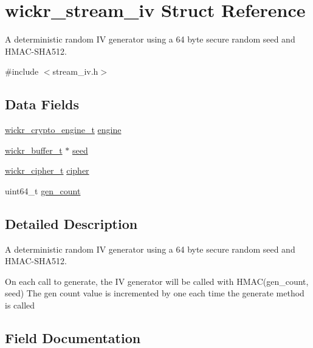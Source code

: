 \hypertarget{structwickr__stream__iv}{}\section{wickr\+\_\+stream\+\_\+iv Struct Reference}
\label{structwickr__stream__iv}


A deterministic random IV generator using a 64 byte secure random seed and H\+M\+A\+C-\/\+S\+H\+A512.  




{\ttfamily \#include $<$stream\+\_\+iv.\+h$>$}

\subsection*{Data Fields}
\begin{DoxyCompactItemize}
\item 
\mbox{\hyperlink{structwickr__crypto__engine}{wickr\+\_\+crypto\+\_\+engine\+\_\+t}} \mbox{\hyperlink{structwickr__stream__iv_a8c597718ade583db19204df7bfed7e85}{engine}}
\item 
\mbox{\hyperlink{structwickr__buffer}{wickr\+\_\+buffer\+\_\+t}} $\ast$ \mbox{\hyperlink{structwickr__stream__iv_a221017bc41b4cc36bf31f13a0c299db1}{seed}}
\item 
\mbox{\hyperlink{structwickr__cipher}{wickr\+\_\+cipher\+\_\+t}} \mbox{\hyperlink{structwickr__stream__iv_a86379d83e28b96d4852ac047482713d1}{cipher}}
\item 
uint64\+\_\+t \mbox{\hyperlink{structwickr__stream__iv_ae7d500c34333c546ee044fe875e10dfc}{gen\+\_\+count}}
\end{DoxyCompactItemize}


\subsection{Detailed Description}
A deterministic random IV generator using a 64 byte secure random seed and H\+M\+A\+C-\/\+S\+H\+A512. 

On each call to generate, the IV generator will be called with H\+M\+A\+C(gen\+\_\+count, seed) The gen count value is incremented by one each time the generate method is called 

\subsection{Field Documentation}
\mbox{\label{structwickr__stream__iv_a86379d83e28b96d4852ac047482713d1}} 
